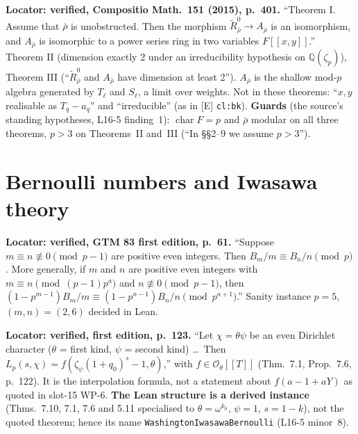 \begin{hypothesis}\label{lit:bk}
   \leanok
  \textbf{Locator: verified, Compositio Math.\ 151 (2015), p.~401.}
  ``Theorem I. Assume that $\bar\rho$ is unobstructed. Then the morphism $\tilde R^0_{\bar\rho}\to A_{\bar\rho}$ is an
  isomorphism, and $A_{\bar\rho}$ is isomorphic to a power series ring in two variables $F[[x,y]]$.'' Theorem II
  (dimension exactly 2 under an irreducibility hypothesis on $\mathbb{Q}(\zeta_p)$), Theorem III
  (``$\tilde R^0_{\bar\rho}$ and $A_{\bar\rho}$ have dimension at least 2''). $A_{\bar\rho}$ is the shallow
  mod-$p$ algebra generated by $T_\ell$ and $S_\ell$, a limit over weights. Not in these theorems: ``$x,y$
  realisable as $T_q-a_q$'' and ``irreducible'' (as in [E] \texttt{cl:bk}).
  \textbf{Guards} (the source's standing hypotheses, L16-5 finding~1): $\operatorname{char}F=p$ and $\bar\rho$ modular
  on all three theorems, $p>3$ on Theorems~II and~III (``In \S\S 2--9 we assume $p>3$'').
\end{hypothesis}

\section{Bernoulli numbers and Iwasawa theory}

\begin{hypothesis}\label{lit:washington-5.14}
   \leanok
  \textbf{Locator: verified, GTM 83 first edition, p.~61.} ``Suppose $m\equiv n\not\equiv0\pmod{p-1}$ are
  positive even integers. Then $B_m/m\equiv B_n/n\pmod p$. More generally, if $m$ and $n$ are positive even
  integers with $m\equiv n\pmod{(p-1)p^a}$ and $n\not\equiv0\pmod{p-1}$, then
  $(1-p^{m-1})B_m/m\equiv(1-p^{n-1})B_n/n\pmod{p^{a+1}}$.'' Sanity instance $p=5$, $(m,n)=(2,6)$ decided in Lean.
\end{hypothesis}

\begin{hypothesis}\label{lit:washington-7.10}
   \leanok
  \textbf{Locator: verified, first edition, p.~123.} ``Let $\chi=\theta\psi$ be an even Dirichlet character
  ($\theta$ = first kind, $\psi$ = second kind) \dots\ Then $L_p(s,\chi)=f(\zeta_\psi(1+q_0)^s-1,\theta)$,''
  with $f\in\mathcal{O}_\theta[[T]]$ (Thm.~7.1, Prop.~7.6, p.~122). It is the interpolation formula, not a
  statement about $f(a-1+aY)$ as quoted in slot-15 WP-6. \textbf{The Lean structure is a derived instance}
  (Thms.~7.10, 7.1, 7.6 and 5.11 specialised to $\theta=\omega^{k_0}$, $\psi=1$, $s=1-k$), not the quoted theorem;
  hence its name \texttt{WashingtonIwasawaBernoulli} (L16-5 minor~8).
\end{hypothesis}

